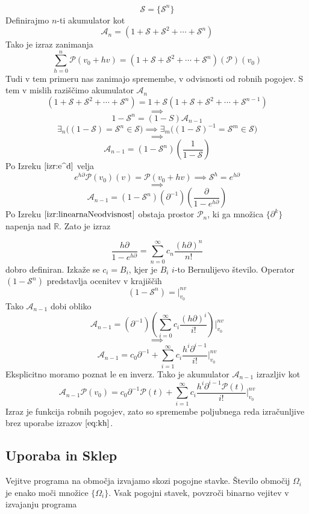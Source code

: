\documentclass{article}
\newcommand{\RR}{\mathbb{R}}
\newcommand{\Shift}{\mathcal{S}}
\newcommand{\dP}{\mathcal{P}}
\newcommand{\D}{\partial}
\begin{document}
   $$\Shift=\{\Shift^n\}$$   
   Definirajmo $n$-ti akumulator kot 
   $$\mathcal{A}_n=(1+\Shift+\Shift^2+\cdots+\Shift^n)$$ Tako je izraz zanimanja
   $$\sum\limits_{h=0}^{n}\dP(v_0+hv)=(1+\Shift+\Shift^2+\cdots+\Shift^n)(\dP)(v_0)$$
   Tudi v tem primeru nas zanimajo spremembe, v odvisnosti od robnih pogojev. S tem v mislih raziščimo akumulator $\mathcal{A}_n$
   $$(1+\Shift+\Shift^2+\cdots+\Shift^n)=1+\Shift(1+\Shift+\Shift^2+\cdots+\Shift^{n-1})$$
   $$\implies$$
   $$1-\Shift^n=(1-S)\mathcal{A}_{n-1}$$
   $$\exists_n\Big((1-\Shift)=\Shift^n\in\Shift\Big)\implies \exists_m\Big((1-\Shift)^{-1}=\Shift^m\in \Shift\Big)$$
   $$\implies$$
   $$\mathcal{A}_{n-1}=(1-\Shift^n)(\frac{1}{1-\Shift})$$
   Po Izreku $\ref{izr:e^d}$ velja
   $$e^{h\D}\dP(v_0)(v)=\dP(v_0+hv)\implies \Shift^h=e^{h\D}$$
   $$\implies$$
   $$\mathcal{A}_{n-1}=(1-\Shift^n)(\D^{-1})(\frac{\D}{1-e^{h\D}})$$
   Po Izreku $\ref{izr:linearnaNeodvisnost}$  obstaja prostor $\dP_n$, ki ga množica $\{\D^k\}$ napenja nad $\RR$. Zato je izraz   
     
    \begin{equation}
    	\frac{h\D}{1-e^{h\D}}=\sum\limits_{n=0}^{\infty}c_n\frac{(h\D)^n}{n!}
    \end{equation}
    dobro definiran. Izkaže se $c_i=B_i$, kjer je $B_i$ $i$-to Bernulijevo število. Operator $(1-\Shift^n)$ predstavlja ocenitev v krajiščih
    $$(1-\Shift^n)=\Bigg\vert_{v_0}^{nv}$$
    Tako $\mathcal{A}_{n-1}$ dobi obliko
    $$\mathcal{A}_{n-1}=(\D^{-1})(\sum\limits_{i=0}^{\infty}c_i\frac{(h\D)^i}{i!})\Bigg\vert_{v_0}^{nv}$$
    $$\implies$$
    \begin{equation}
    \mathcal{A}_{n-1}=c_0\D^{-1}+\sum\limits_{i=1}^{\infty}c_i\frac{h^i\D^{i-1}}{i!}\Bigg\vert_{v_0}^{nv}
    \end{equation}
    Eksplicitno moramo poznat le en inverz. Tako je akumulator $\mathcal{A}_{n-1}$ izrazljiv kot
    \begin{equation}
    	\mathcal{A}_{n-1}\dP(v_0)=c_0\D^{-1}\dP(t)+\sum\limits_{i=1}^{\infty}c_i\frac{h^i\D^{i-1}\dP(t)}{i!}\Bigg\vert_{v_0}^{nv}
    \end{equation}
    Izraz je funkcija robnih pogojev, zato so spremembe poljubnega reda izračunljive brez uporabe izrazov $\eqref{eq:kh}$.

\subsection{Uporaba in Sklep}

Vejitve programa na območja izvajamo skozi pogojne stavke. Število območij $\Omega_i$ je enako moči množice $\{\Omega_i\}$. Vsak pogojni stavek, povzroči binarno vejitev v izvajanju programa
\end{document}
